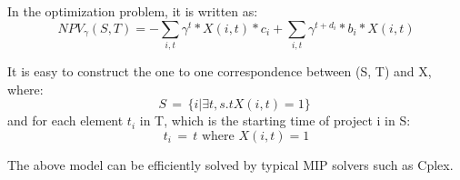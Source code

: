 \documentclass[final,3p,times]{elsarticle}
\begin{document}
In the optimization problem, it is written as:
\begin{equation}
	NPV_{\gamma} ( S,T ) = - \sum\limits_{i,t} \gamma^t *X(i,t)* c_i + \sum\limits_{i,t} \gamma^{t+d_i} *b_i * X(i,t)
\end{equation}

It is easy to construct the one to one correspondence between (S, T) and X, where:
\begin{equation}
S\,=\,\{i | \exists t, s.t X(i,t)=1\}\;
\end{equation}
and for each element $t_i$ in T, which is the starting time of project i in S:
\begin{equation}
t_i\,=\,t \mbox{   where  } X(i,t)=1
\end{equation}


The above model can be efficiently solved by typical MIP solvers such as Cplex.
\end{document}
